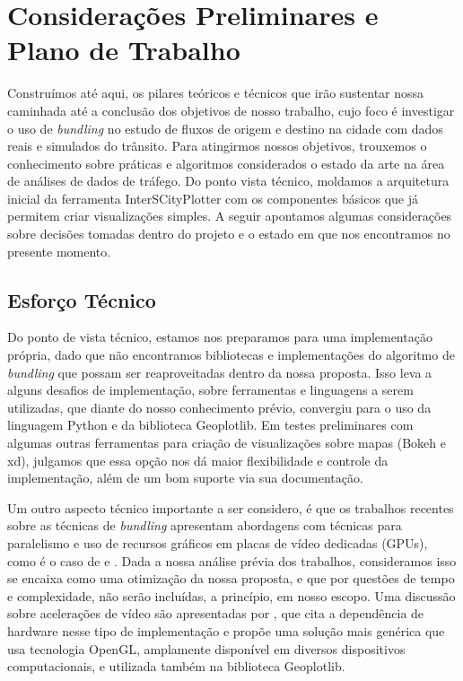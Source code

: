 \chapter{Considerações Preliminares e Plano de Trabalho}
\label{cap:plano-de-trabalho}

  Construímos até aqui, os pilares teóricos e técnicos que irão sustentar nossa
caminhada até a conclusão dos objetivos de nosso trabalho, cujo foco é
investigar o uso de \emph{bundling} no estudo de fluxos de origem e destino na
cidade com dados reais e simulados do trânsito. Para atingirmos nossos
objetivos, trouxemos o conhecimento sobre práticas e algoritmos
considerados o estado da arte na área de análises de dados de tráfego. Do ponto
vista técnico, moldamos a arquitetura inicial da ferramenta InterSCityPlotter
com os componentes básicos que já permitem criar visualizações simples. A
seguir apontamos algumas considerações sobre decisões tomadas dentro do projeto
e o estado em que nos encontramos no presente momento.


\section{Esforço Técnico}

  Do ponto de vista técnico, estamos nos preparamos para uma implementação
própria, dado que não encontramos bibliotecas e implementações do algoritmo de
\emph{bundling} que possam ser reaproveitadas dentro da nossa proposta. Isso
leva a alguns desafios de implementação, sobre ferramentas e linguagens a serem
utilizadas, que diante do nosso conhecimento prévio, convergiu para o uso da
linguagem Python e da biblioteca Geoplotlib. Em testes preliminares com algumas
outras ferramentas para criação de visualizações sobre mapas (Bokeh e xd),
julgamos que essa opção nos dá maior flexibilidade e controle da implementação,
além de um bom suporte via sua documentação. 

Um outro aspecto técnico importante a ser considero, é que os trabalhos recentes sobre
as técnicas de \emph{bundling} apresentam abordagens com técnicas para
paralelismo e uso de recursos gráficos em placas de vídeo dedicadas (GPUs),
como é o caso de \citet{Hurter2012} e \citet{ADEB}. Dada a nossa análise prévia
dos trabalhos, consideramos isso se encaixa como uma otimização da nossa proposta, e que
por questões de tempo e complexidade, não serão incluídas, a princípio, em
nosso escopo.  Uma discussão sobre acelerações de vídeo são apresentadas por
\citet{}, que cita a dependência de hardware nesse tipo de implementação e
propõe uma solução mais genérica que usa tecnologia OpenGL, amplamente
disponível em diversos dispositivos computacionais, e utilizada também na
biblioteca Geoplotlib. 

